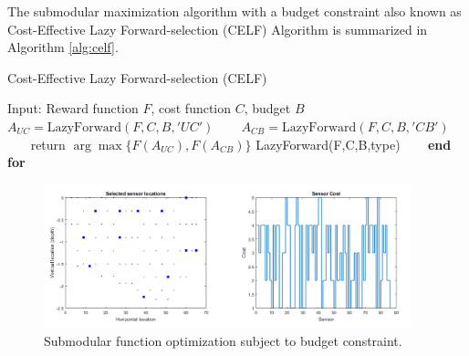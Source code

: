 The submodular maximization algorithm with a budget constraint also known as Cost-Effective Lazy Forward-selection (CELF) Algorithm is summarized in Algorithm \ref{alg:celf}.

\begin{algorithm}
\caption{Cost-Effective Lazy Forward-selection (CELF)}
\label{alg:celf}
\begin{algorithmic}[1]
\STATE Input: Reward function $F$, cost function $C$, budget $B$
\STATE ~~~ $A_{UC} = \mathrm{LazyForward}(F,C,B,'UC')$
\STATE ~~~ $A_{CB} = \mathrm{LazyForward}(F,C,B,'CB')$
\STATE ~~~ return $\arg \max \{F(A_{UC}),F(A_{CB})\}$
\STATE LazyForward(F,C,B,type)
\STATE ~~~ 
\STATE \textbf{end for}  
\end{algorithmic}
\end{algorithm}



\begin{figure}[tbhp]
    \centering
    \includegraphics[width=0.95\textwidth, trim={10 10 10 10}]{figures/sfo_budget_merged.png}
    \caption{Submodular function optimization subject to budget constraint.}
    \label{fig:sensors_budget}
\end{figure}







